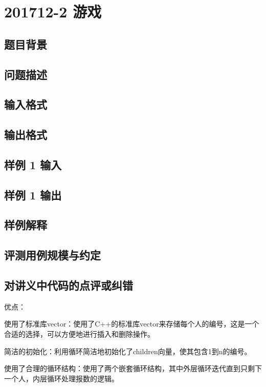 \section{201712-2 游戏}

\subsection{题目背景}

\subsection{问题描述}

\subsection{输入格式}

\subsection{输出格式}

\subsection{样例 1 输入}

\subsection{样例 1 输出}

\subsection{样例解释}

\subsection{评测用例规模与约定}

\subsection{对讲义中代码的点评或纠错}
 
优点：

使用了标准库vector：使用了C++的标准库vector来存储每个人的编号，这是一个合适的选择，可以方便地进行插入和删除操作。

简洁的初始化：利用循环简洁地初始化了children向量，使其包含1到n的编号。

使用了合理的循环结构：使用了两个嵌套循环结构，其中外层循环迭代直到只剩下一个人，内层循环处理报数的逻辑。

